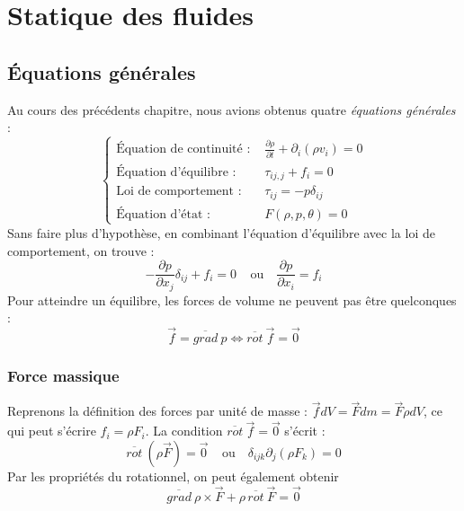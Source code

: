 \chapter{Statique des fluides}
\section{Équations générales}
Au cours des précédents chapitre, nous avions obtenus quatre \textit{équations générales} :
\begin{equation}
	\left\{\begin{array}{ll}
	\text{Équation de continuité : } & \frac{\partial \rho}{\partial t} + \partial_i(\rho v_i)
	=0\\
	\text{Équation d'équilibre : } & \tau_{ij,j} + f_i = 0\\
	\text{Loi de comportement : } & \tau_{ij} = -p\delta_{ij}\\
	\text{Équation d'état : } & F(\rho,p, \theta) = 0
	\end{array}\right.
\end{equation}
Sans faire plus d'hypothèse, en combinant l'équation d'équilibre avec la loi de comportement,
on trouve :
\begin{equation}
	-\frac{\partial p}{\partial x_j}\delta_{ij} + f_i = 0\ \ \ \ \ \text{ou }\ \ \ 
	\frac{\partial p}{\partial x_i} = f_i
\end{equation}
Pour atteindre un équilibre, les forces de volume ne peuvent pas être quelconques :
\begin{equation}
	\vec{f} = \overline{grad}\ p \Leftrightarrow \overline{rot}\ \vec{f} = \vec{0}
\end{equation}

\subsection{Force massique}
Reprenons la définition des forces par unité de masse : $\vec{f}dV = \vec{F}dm = \vec{F}
\rho dV$, ce qui peut s'écrire $f_i = \rho F_i$. La condition $\overline{rot}\ \vec{f} =
\vec{0}$ s'écrit :
\begin{equation}
	\overline{rot}\ (\rho\vec{F}) = \vec{0}\ \ \ \ \ \text{ou }\ \ \ \delta_{ijk}\partial_j
	(\rho F_k) = 0
\end{equation}
Par les propriétés du rotationnel, on peut également obtenir
\begin{equation}
	\overline{grad}\ \rho \times \vec{F} + \rho\,\overline{rot}\ \vec{F} = \vec{0}
\end{equation}		
	
